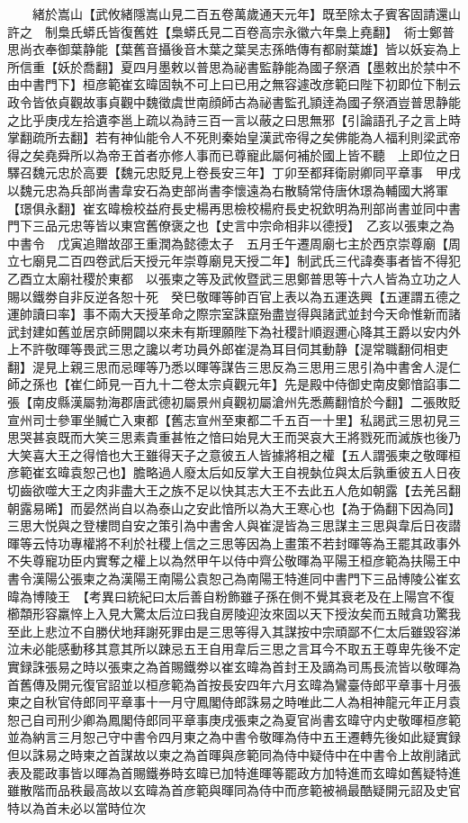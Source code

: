　　緒於嵩山【武攸緒隱嵩山見二百五卷萬歲通天元年】既至除太子賓客固請還山許之　制梟氏蟒氏皆復舊姓【梟蟒氏見二百卷高宗永徽六年梟上堯翻】　術士鄭普思尚衣奉御葉静能【葉舊音攝後音木葉之葉吴志孫皓傳有都尉葉雄】皆以妖妄為上所信重【妖於喬翻】夏四月墨敕以普思為祕書監静能為國子祭酒【墨敕出於禁中不由中書門下】桓彦範崔玄暐固執不可上曰已用之無容遽改彦範曰陛下初即位下制云政令皆依貞觀故事貞觀中魏徵虞世南顔師古為祕書監孔頴逹為國子祭酒豈普思静能之比乎庚戌左拾遺李邕上疏以為詩三百一言以蔽之曰思無邪【引論語孔子之言上時掌翻疏所去翻】若有神仙能令人不死則秦始皇漢武帝得之矣佛能為人福利則梁武帝得之矣堯舜所以為帝王首者亦修人事而已尊寵此屬何補於國上皆不聽　上即位之日驛召魏元忠於高要【魏元忠貶見上卷長安三年】丁卯至都拜衛尉卿同平章事　甲戌以魏元忠為兵部尚書韋安石為吏部尚書李懷遠為右散騎常侍唐休璟為輔國大將軍【璟俱永翻】崔玄暐檢校益府長史楊再思檢校楊府長史祝欽明為刑部尚書並同中書門下三品元忠等皆以東宫舊僚褒之也【史言中宗命相非以德授】　乙亥以張柬之為中書令　戊寅追贈故邵王重潤為懿德太子　五月壬午遷周廟七主於西京崇尊廟【周立七廟見二百四卷武后天授元年崇尊廟見天授二年】制武氏三代諱奏事者皆不得犯　乙酉立太廟社稷於東都　以張柬之等及武攸暨武三思鄭普思等十六人皆為立功之人賜以鐵劵自非反逆各恕十死　癸巳敬暉等帥百官上表以為五運迭興【五運謂五德之運帥讀曰率】事不兩大天授革命之際宗室誅竄殆盡豈得與諸武並封今天命惟新而諸武封建如舊並居京師開闢以來未有斯理願陛下為社稷計順遐邇心降其王爵以安内外上不許敬暉等畏武三思之讒以考功員外郎崔湜為耳目伺其動静【湜常職翻伺相吏翻】湜見上親三思而忌暉等乃悉以暉等謀告三思反為三思用三思引為中書舍人湜仁師之孫也【崔仁師見一百九十二卷太宗貞觀元年】先是殿中侍御史南皮鄭愔諂事二張【南皮縣漢屬勃海郡唐武德初屬景州貞觀初屬滄州先悉薦翻愔於今翻】二張敗貶宣州司士參軍坐贓亡入東都【舊志宣州至東都二千五百一十里】私謁武三思初見三思哭甚哀既而大笑三思素貴重甚恠之愔曰始見大王而哭哀大王將戮死而滅族也後乃大笑喜大王之得愔也大王雖得天子之意彼五人皆據將相之權【五人謂張柬之敬暉桓彦範崔玄暐袁恕己也】膽略過人廢太后如反掌大王自視埶位與太后孰重彼五人日夜切齒欲噬大王之肉非盡大王之族不足以快其志大王不去此五人危如朝露【去羌呂翻朝露易晞】而晏然尚自以為泰山之安此愔所以為大王寒心也【為于偽翻下因為同】三思大悦與之登樓問自安之策引為中書舍人與崔湜皆為三思謀主三思與韋后日夜譛暉等云恃功專權將不利於社稷上信之三思等因為上畫策不若封暉等為王罷其政事外不失尊寵功臣内實奪之權上以為然甲午以侍中齊公敬暉為平陽王桓彦範為扶陽王中書令漢陽公張柬之為漢陽王南陽公袁恕己為南陽王特進同中書門下三品博陵公崔玄暐為博陵王　【考異曰統紀曰太后善自粉飾雖子孫在側不覺其衰老及在上陽宫不復櫛頮形容羸悴上入見大驚太后泣曰我自房陵迎汝來固以天下授汝矣而五賊貪功驚我至此上悲泣不自勝伏地拜謝死罪由是三思等得入其謀按中宗頑鄙不仁太后雖毀容涕泣未必能感動移其意其所以踈忌五王自用韋后三思之言耳今不取五王尊卑先後不定實録誅張易之時以張柬之為首賜鐵劵以崔玄暐為首封王及謫為司馬長流皆以敬暉為首舊傳及開元復官詔並以桓彦範為首按長安四年六月玄暐為鸞臺侍郎平章事十月張柬之自秋官侍郎同平章事十一月守鳳閣侍郎誅易之時唯此二人為相神龍元年正月袁恕己自司刑少卿為鳳閣侍郎同平章事庚戌張柬之為夏官尚書玄暐守内史敬暉桓彦範並為納言三月恕己守中書令四月東之為中書令敬暉為侍中五王遷轉先後如此疑實録但以誅易之時柬之首謀故以柬之為首暉與彦範同為侍中疑侍中在中書令上故削諸武表及罷政事皆以暉為首賜鐵券時玄暐已加特進暉等罷政方加特進而玄暐如舊疑特進雖散階而品秩最高故以玄暐為首彦範與暉同為侍中而彦範被禍最酷疑開元詔及史官特以為首未必以當時位次